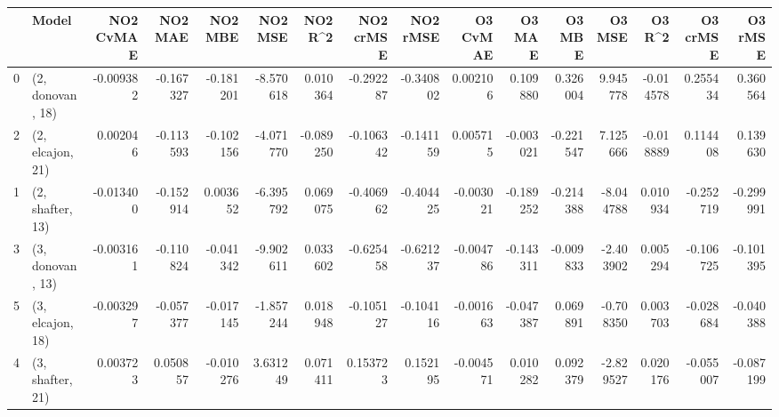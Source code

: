 \begin{tabular}{llrrrrrrrrrrrrrr}
\toprule
{} &             Model &  NO2 CvMAE &   NO2 MAE &   NO2 MBE &   NO2 MSE &   NO2 R\textasciicircum2 &  NO2 crMSE &  NO2 rMSE &  O3 CvMAE &    O3 MAE &    O3 MBE &    O3 MSE &    O3 R\textasciicircum2 &  O3 crMSE &   O3 rMSE \\
\midrule
0 &  (2, donovan, 18) &  -0.009382 & -0.167327 & -0.181201 & -8.570618 &  0.010364 &  -0.292287 & -0.340802 &  0.002106 &  0.109880 &  0.326004 &  9.945778 & -0.014578 &  0.255434 &  0.360564 \\
2 &  (2, elcajon, 21) &   0.002046 & -0.113593 & -0.102156 & -4.071770 & -0.089250 &  -0.106342 & -0.141159 &  0.005715 & -0.003021 & -0.221547 &  7.125666 & -0.018889 &  0.114408 &  0.139630 \\
1 &  (2, shafter, 13) &  -0.013400 & -0.152914 &  0.003652 & -6.395792 &  0.069075 &  -0.406962 & -0.404425 & -0.003021 & -0.189252 & -0.214388 & -8.044788 &  0.010934 & -0.252719 & -0.299991 \\
3 &  (3, donovan, 13) &  -0.003161 & -0.110824 & -0.041342 & -9.902611 &  0.033602 &  -0.625458 & -0.621237 & -0.004786 & -0.143311 & -0.009833 & -2.403902 &  0.005294 & -0.106725 & -0.101395 \\
5 &  (3, elcajon, 18) &  -0.003297 & -0.057377 & -0.017145 & -1.857244 &  0.018948 &  -0.105127 & -0.104116 & -0.001663 & -0.047387 &  0.069891 & -0.708350 &  0.003703 & -0.028684 & -0.040388 \\
4 &  (3, shafter, 21) &   0.003723 &  0.050857 & -0.010276 &  3.631249 &  0.071411 &   0.153723 &  0.152195 & -0.004571 &  0.010282 &  0.092379 & -2.829527 &  0.020176 & -0.055007 & -0.087199 \\
\bottomrule
\end{tabular}
